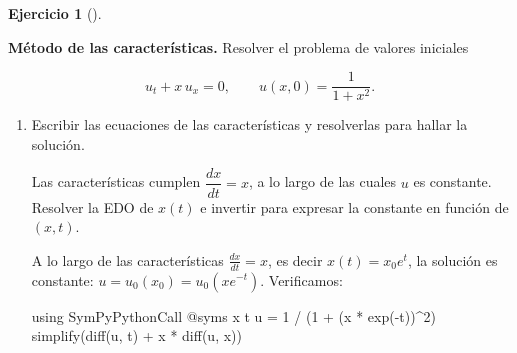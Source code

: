 \documentclass[
  spanish,
  a4paper,
]{scrreport}
\newenvironment{Shaded}{\begin{snugshade}}{\end{snugshade}}
\newcommand{\BuiltInTok}[1]{\textcolor[rgb]{0.00,0.23,0.31}{#1}}
\newcommand{\FloatTok}[1]{\textcolor[rgb]{0.68,0.00,0.00}{#1}}
\newcommand{\FunctionTok}[1]{\textcolor[rgb]{0.28,0.35,0.67}{#1}}
\newcommand{\ImportTok}[1]{\textcolor[rgb]{0.00,0.46,0.62}{#1}}
\newcommand{\NormalTok}[1]{\textcolor[rgb]{0.00,0.23,0.31}{#1}}
\newcommand{\OperatorTok}[1]{\textcolor[rgb]{0.37,0.37,0.37}{#1}}
\newcommand{\PreprocessorTok}[1]{\textcolor[rgb]{0.68,0.00,0.00}{#1}}
\theoremstyle{definition}
\newtheorem{exercise}{Ejercicio}[chapter]
\theoremstyle{remark}
\begin{document}
\begin{exercise}[]\protect\hypertarget{exr-caracteristicas}{}\label{exr-caracteristicas}

\textbf{Método de las características.} Resolver el problema de valores
iniciales

\[
u_t + x\,u_x = 0, \qquad u(x, 0) = \frac{1}{1 + x^2}.
\]

\begin{enumerate}
\def\labelenumi{\alph{enumi}.}
\item
  Escribir las ecuaciones de las características y resolverlas para
  hallar la solución.

  \begin{tcolorbox}[enhanced jigsaw, arc=.35mm, bottomrule=.15mm, bottomtitle=1mm, breakable, colback=white, colbacktitle=quarto-callout-note-color!10!white, colframe=quarto-callout-note-color-frame, coltitle=black, left=2mm, leftrule=.75mm, opacityback=0, opacitybacktitle=0.6, rightrule=.15mm, title=\textcolor{quarto-callout-note-color}{\faInfo}\hspace{0.5em}{Ayuda}, titlerule=0mm, toprule=.15mm, toptitle=1mm]

  Las características cumplen \(\dfrac{dx}{dt} = x\), a lo largo de las
  cuales \(u\) es constante. Resolver la EDO de \(x(t)\) e invertir para
  expresar la constante en función de \((x, t)\).

  \end{tcolorbox}

  \begin{tcolorbox}[enhanced jigsaw, arc=.35mm, bottomrule=.15mm, bottomtitle=1mm, breakable, colback=white, colbacktitle=quarto-callout-tip-color!10!white, colframe=quarto-callout-tip-color-frame, coltitle=black, left=2mm, leftrule=.75mm, opacityback=0, opacitybacktitle=0.6, rightrule=.15mm, title=\textcolor{quarto-callout-tip-color}{\faLightbulb}\hspace{0.5em}{Solución}, titlerule=0mm, toprule=.15mm, toptitle=1mm]

  A lo largo de las características \(\frac{dx}{dt} = x\), es decir
  \(x(t) = x_0 e^{t}\), la solución es constante:
  \(u = u_0(x_0) = u_0(x e^{-t})\). Verificamos:

\begin{Shaded}
\begin{Highlighting}[]
\ImportTok{using} \BuiltInTok{SymPyPythonCall}
\PreprocessorTok{@syms}\NormalTok{ x t}
\NormalTok{u }\OperatorTok{=} \FloatTok{1} \OperatorTok{/}\NormalTok{ (}\FloatTok{1} \OperatorTok{+}\NormalTok{ (x }\OperatorTok{*} \FunctionTok{exp}\NormalTok{(}\OperatorTok{{-}}\NormalTok{t))}\OperatorTok{\^{}}\FloatTok{2}\NormalTok{)}
\FunctionTok{simplify}\NormalTok{(}\FunctionTok{diff}\NormalTok{(u, t) }\OperatorTok{+}\NormalTok{ x }\OperatorTok{*} \FunctionTok{diff}\NormalTok{(u, x))}
\end{Highlighting}
\end{Shaded}


\end{tcolorbox}
\end{enumerate}
\end{exercise}
\end{document}
